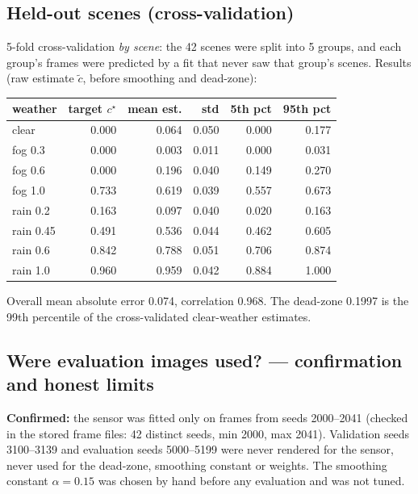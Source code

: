 \documentclass[11pt,a4paper]{article}
\begin{document}
\subsection{Held-out scenes (cross-validation)}
5-fold cross-validation \emph{by scene}: the 42 scenes were split into 5 groups, and each group's frames were predicted by a fit that never saw that group's scenes. Results (raw estimate $\tilde c$, before smoothing and dead-zone):
\begin{center}\small\begin{tabular}{@{}lrrrrr@{}}\toprule
weather & target $c^\star$ & mean est. & std & 5th pct & 95th pct\\\midrule
clear & 0.000 & 0.064 & 0.050 & 0.000 & 0.177\\
fog 0.3 & 0.000 & 0.003 & 0.011 & 0.000 & 0.031\\
fog 0.6 & 0.000 & 0.196 & 0.040 & 0.149 & 0.270\\
fog 1.0 & 0.733 & 0.619 & 0.039 & 0.557 & 0.673\\
rain 0.2 & 0.163 & 0.097 & 0.040 & 0.020 & 0.163\\
rain 0.45 & 0.491 & 0.536 & 0.044 & 0.462 & 0.605\\
rain 0.6 & 0.842 & 0.788 & 0.051 & 0.706 & 0.874\\
rain 1.0 & 0.960 & 0.959 & 0.042 & 0.884 & 1.000\\\bottomrule\end{tabular}\end{center}
Overall mean absolute error 0.074, correlation 0.968. The dead-zone 0.1997 is the 99th percentile of the cross-validated clear-weather estimates.

\subsection{Were evaluation images used? --- confirmation and honest limits}
\textbf{Confirmed:} the sensor was fitted only on frames from seeds 2000--2041 (checked in the stored frame files: 42 distinct seeds, min 2000, max 2041). Validation seeds 3100--3139 and evaluation seeds 5000--5199 were never rendered for the sensor, never used for the dead-zone, smoothing constant or weights. The smoothing constant $\alpha=0.15$ was chosen by hand before any evaluation and was not tuned.
\end{document}
